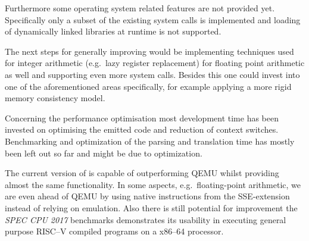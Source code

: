 Furthermore some operating system related features are not provided yet.
Specifically only a subset of the existing system calls is implemented and loading of dynamically linked libraries at runtime is not supported.

The next steps for generally improving \translatorname{} would be implementing techniques used for integer arithmetic (e.g.\ lazy register replacement) for floating point arithmetic as well and supporting even more system calls.
Besides this one could invest into one of the aforementioned areas specifically, for example applying a more rigid memory consistency model.

Concerning the performance optimisation most development time has been invested on optimising the emitted code and reduction of context switches.
Benchmarking and optimization of the parsing and translation time has mostly been left out so far and might be due to optimization.


The current version of \translatorname{} is capable of outperforming QEMU whilst providing almost the same functionality.
In some aspects, e.g.\ floating-point arithmetic, we are even ahead of QEMU by using native instructions from the SSE-extension instead of relying on emulation.
Also there is still potential for improvement the \textit{SPEC CPU 2017} benchmarks demonstrates its usability in executing general purpose RISC--V compiled programs on a x86--64 processor. %